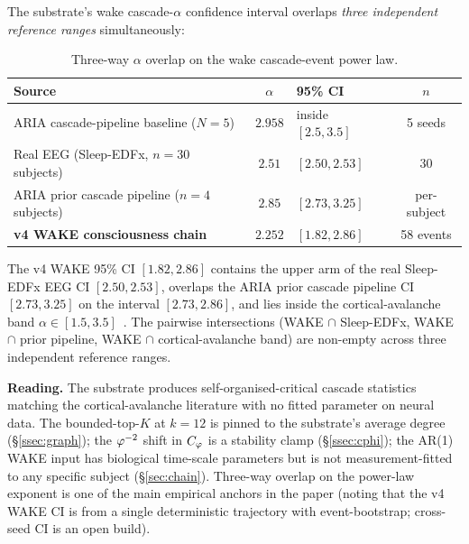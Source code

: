 The substrate's wake cascade-$\alpha$ confidence interval overlaps
\emph{three independent reference ranges} simultaneously:

\begin{table}[ht]
\centering
\small
\caption{Three-way $\alpha$ overlap on the wake cascade-event power
law.}
\label{tab:alpha_overlap}
\begin{tabular}{l c l c}
\toprule
Source & $\alpha$ & 95\% CI & $n$ \\
\midrule
ARIA cascade-pipeline baseline ($N=5$) & $2.958$  & inside $[2.5, 3.5]$ & 5 seeds \\
Real EEG (Sleep-EDFx, $n=30$ subjects)~\citep{SleepEDFx} & $2.51$ & $[2.50, 2.53]$ & 30 \\
ARIA prior cascade pipeline ($n=4$ subjects) & $2.85$ & $[2.73, 3.25]$ & per-subject \\
\textbf{v4 WAKE consciousness chain} & $\mathbf{2.252}$ & $[\mathbf{1.82, 2.86}]$ & 58 events \\
\bottomrule
\end{tabular}
\end{table}

The v4 WAKE 95\% CI $[1.82, 2.86]$ contains the upper arm of the
real Sleep-EDFx EEG CI $[2.50, 2.53]$, overlaps the ARIA prior
cascade pipeline CI $[2.73, 3.25]$ on the interval $[2.73, 2.86]$,
and lies inside the cortical-avalanche band
$\alpha\!\in\![1.5, 3.5]$~\citep{BeggsPlenz2003}. The pairwise
intersections (WAKE $\cap$ Sleep-EDFx, WAKE $\cap$ prior pipeline,
WAKE $\cap$ cortical-avalanche band) are non-empty across three
independent reference ranges.

\textbf{Reading.} The substrate produces self-organised-critical
cascade statistics matching the cortical-avalanche literature with
no fitted parameter on neural data. The bounded-top-$K$ at
$k=12$ is pinned to the substrate's average degree
(\S\ref{ssec:graph}); the $\varphi^{-2}$ shift in $C_{\varphi}$ is a
stability clamp (\S\ref{ssec:cphi}); the AR(1) WAKE input has
biological time-scale parameters but is not measurement-fitted to
any specific subject (\S\ref{sec:chain}). Three-way overlap on the
power-law exponent is one of the main empirical anchors in the paper
(noting that the v4 WAKE CI is from a single deterministic trajectory
with event-bootstrap; cross-seed CI is an open build).

